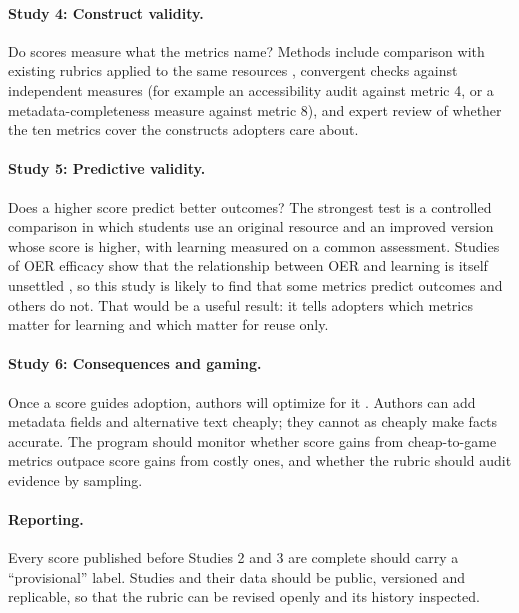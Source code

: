 \paragraph{Study 4: Construct validity.}
Do scores measure what the metrics name? Methods include comparison with existing rubrics applied to the same resources \cite{yuan2015}, convergent checks against independent measures (for example an accessibility audit against metric 4, or a metadata-completeness measure \cite{ochoa2009} against metric 8), and expert review of whether the ten metrics cover the constructs adopters care about.

\paragraph{Study 5: Predictive validity.}
Does a higher score predict better outcomes? The strongest test is a controlled comparison in which students use an original resource and an improved version whose score is higher, with learning measured on a common assessment. Studies of OER efficacy show that the relationship between OER and learning is itself unsettled \cite{tlili2023,hilton2020}, so this study is likely to find that some metrics predict outcomes and others do not. That would be a useful result: it tells adopters which metrics matter for learning and which matter for reuse only.

\paragraph{Study 6: Consequences and gaming.}
Once a score guides adoption, authors will optimize for it \cite{campbell1979,strathern1997}. Authors can add metadata fields and alternative text cheaply; they cannot as cheaply make facts accurate. The program should monitor whether score gains from cheap-to-game metrics outpace score gains from costly ones, and whether the rubric should audit evidence by sampling.

\paragraph{Reporting.}
Every score published before Studies 2 and 3 are complete should carry a ``provisional'' label. Studies and their data should be public, versioned and replicable, so that the rubric can be revised openly and its history inspected.
